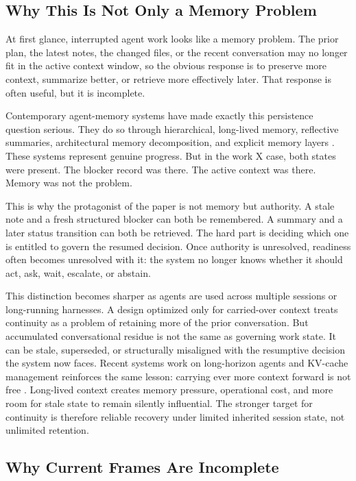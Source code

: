 \documentclass[a4paper,fleqn]{cas-dc}
\begin{document}
\subsection{Why This Is Not Only a Memory Problem}

At first glance, interrupted agent work looks like a memory problem. The prior plan, the latest notes, the changed files, or the recent conversation may no longer fit in the active context window, so the obvious response is to preserve more context, summarize better, or retrieve more effectively later. That response is often useful, but it is incomplete.

Contemporary agent-memory systems have made exactly this persistence question serious. They do so through hierarchical, long-lived memory, reflective summaries, architectural memory decomposition, and explicit memory layers \cite{Packer2023,Shinn2023,Sumers2023,ZhangMemory2024,Chhikara2025}. These systems represent genuine progress. But in the work X case, both states were present. The blocker record was there. The active context was there. Memory was not the problem.

This is why the protagonist of the paper is not memory but authority. A stale note and a fresh structured blocker can both be remembered. A summary and a later status transition can both be retrieved. The hard part is deciding which one is entitled to govern the resumed decision. Once authority is unresolved, readiness often becomes unresolved with it: the system no longer knows whether it should act, ask, wait, escalate, or abstain.

This distinction becomes sharper as agents are used across multiple sessions or long-running harnesses. A design optimized only for carried-over context treats continuity as a problem of retaining more of the prior conversation. But accumulated conversational residue is not the same as governing work state. It can be stale, superseded, or structurally misaligned with the resumptive decision the system now faces. Recent systems work on long-horizon agents and KV-cache management reinforces the same lesson: carrying ever more context forward is not free \cite{Wang2026,Wu2026}. Long-lived context creates memory pressure, operational cost, and more room for stale state to remain silently influential. The stronger target for continuity is therefore reliable recovery under limited inherited session state, not unlimited retention.

\subsection{Why Current Frames Are Incomplete}
\end{document}
